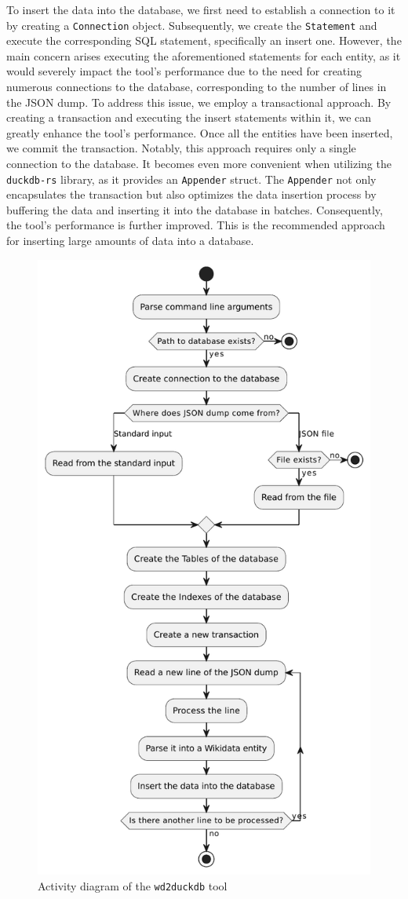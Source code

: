 To insert the data into the database, we first need to establish a connection to it by creating a \texttt{Connection} object. Subsequently, we create the \texttt{Statement} and execute the corresponding SQL statement, specifically an insert one. However, the main concern arises executing the aforementioned statements for each entity, as it would severely impact the tool's performance due to the need for creating numerous connections to the database, corresponding to the number of lines in the JSON dump. To address this issue, we employ a transactional approach. By creating a transaction and executing the insert statements within it, we can greatly enhance the tool's performance. Once all the entities have been inserted, we commit the transaction. Notably, this approach requires only a single connection to the database. It becomes even more convenient when utilizing the \texttt{duckdb-rs} library, as it provides an \texttt{Appender} struct. The \texttt{Appender} not only encapsulates the transaction but also optimizes the data insertion process by buffering the data and inserting it into the database in batches. Consequently, the tool's performance is further improved. This is the recommended approach for inserting large amounts of data into a database.

\begin{figure}[p]
    \centering
    \includegraphics[width=.66\linewidth]{figures/diagrams/10-2_wd2duckdb.pdf}
    \caption{Activity diagram of the \texttt{wd2duckdb} tool}
    \label{fig:activity}
\end{figure}%

